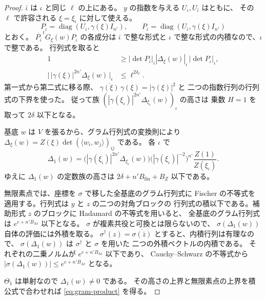 \begin{proof}
\(\bar\iota\) は \(\iota\) と同じ \(\ell\) の上にある。
\(y\) の指数を与える \(U_\iota,U_{\bar\iota}\) はともに、
その \(\ell\) で許容される \(\xi=\xi_\iota\) に対して使える。
\[
  P_\iota=\operatorname{diag}(U_\iota,\gamma(\xi)I_{n'}),\qquad
  P_{\bar\iota}=\operatorname{diag}(U_{\bar\iota},\gamma(\xi)I_{n'})
\]
とおく。
\(\overline{P_{\bar\iota}}^{\,t}G_\xi(w)P_\iota\) の各成分は
\(\bar\iota\) で整な形式と \(\iota\) で整な形式の内積なので、\(\iota\) で整である。
行列式を取ると
\begin{align*}
 1&\ge|\det P_{\bar\iota}|_{\bar\iota}
             |\Delta_\xi(w)|_\iota\,|\det P_\iota|_\iota,\\
 \bigl|\,|\gamma(\xi)|^{2n'}\Delta_\xi(w)\,\bigr|_\iota
     &\le\ell^{2\delta_\ell}.
\end{align*}
第一式から第二式に移る際、
\(\overline{\gamma(\xi)}\,\gamma(\xi)=|\gamma(\xi)|^2\) と
二つの指数行列の行列式の下界を使った。
従って族 \((|\gamma(\xi_\iota)|^{2n'}\Delta_{\xi_\iota}(w))_\iota\) の高さは
乗数 \(H=1\) を取って \(2\delta\) 以下となる。

基底 \(w\) は \(V\) を張るから、グラム行列式の変換則により
\(\Delta_\xi(w)=Z(\xi)\det(\langle w_i,w_j\rangle)_{ij}\) である。
各 \(\iota\) で
\[
 \Delta_1(w)
 =\bigl(|\gamma(\xi_\iota)|^{2n'}\Delta_{\xi_\iota}(w)\bigr)
     \bigl(|\gamma(\xi_\iota)|^{-2}\bigr)^{n'}
     \frac{Z(1)}{Z(\xi_\iota)} .
\]
ゆえに \(\Delta_1(w)\) の定数族の高さは
\(2\delta+n'B_{\mathrm{fin}}+B_Z\) 以下である。

無限素点では、座標を \(\sigma\) で移した全基底のグラム行列式に
Fischer の不等式を適用する。行列式は \(y\) と \(z\) の二つの対角ブロックの
行列式の積以下である。補助形式 \(z\) のブロックに Hadamard の不等式を用いると、
全基底のグラム行列式は \(e^{c+n'B_{\mathrm{Ar}}}\) 以下となる。
\(\sigma\) が複素共役と可換とは限らないので、
\(\sigma(\Delta_1(w))\) 自体の評価には外積を取る。
\(\sigma^\dagger(z)=\overline{\sigma(\bar z)}\) とすると、内積行列は有理なので、
\(\sigma(\Delta_1(w))\) は \(\sigma^\dagger\) と \(\sigma\) を用いた
二つの外積ベクトルの内積である。
それぞれの二乗ノルムが \(e^{c+n'B_{\mathrm{Ar}}}\) 以下であり、
Cauchy--Schwarz の不等式から
\(\left|\sigma(\Delta_1(w))\right|\le e^{c+n'B_{\mathrm{Ar}}}\) となる。

\(\Theta_1\) は単射なので \(\Delta_1(w)\ne0\) である。
その高さの上界と無限素点の上界を積公式で合わせれば
\eqref{eq:gram-product} を得る。
\end{proof}
